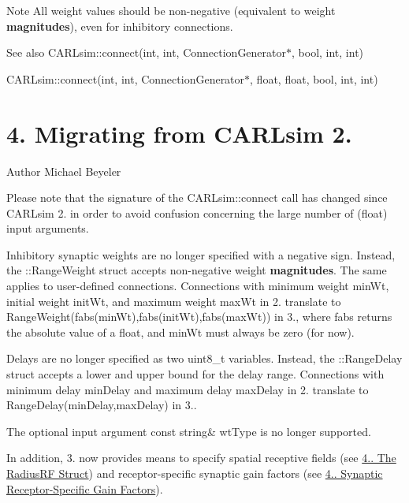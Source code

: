 \begin{DoxyNote}{Note}
All weight values should be non-\/negative (equivalent to weight {\bfseries magnitudes}), even for inhibitory connections. 
\end{DoxyNote}
\begin{DoxySeeAlso}{See also}
C\+A\+R\+Lsim\+::connect(int, int, Connection\+Generator$\ast$, bool, int, int) 

C\+A\+R\+Lsim\+::connect(int, int, Connection\+Generator$\ast$, float, float, bool, int, int)
\end{DoxySeeAlso}
\hypertarget{ch4_connections_ch4s4_migrating_connect}{}\section{4. Migrating from C\+A\+R\+Lsim 2.}\label{ch4_connections_ch4s4_migrating_connect}
\begin{DoxyAuthor}{Author}
Michael Beyeler
\end{DoxyAuthor}
Please note that the signature of the C\+A\+R\+Lsim\+::connect call has changed since C\+A\+R\+Lsim 2. in order to avoid confusion concerning the large number of (float) input arguments.
\begin{DoxyItemize}
\item Inhibitory synaptic weights are no longer specified with a negative sign. Instead, the \+::\+Range\+Weight struct accepts non-\/negative weight {\bfseries magnitudes}. The same applies to user-\/defined connections. Connections with minimum weight {\ttfamily min\+Wt}, initial weight {\ttfamily init\+Wt}, and maximum weight {\ttfamily max\+Wt} in 2. translate to {\ttfamily Range\+Weight(fabs(min\+Wt),fabs(init\+Wt),fabs(max\+Wt))} in 3., where {\ttfamily fabs} returns the absolute value of a {\ttfamily float}, and {\ttfamily min\+Wt} must always be zero (for now).
\item Delays are no longer specified as two {\ttfamily uint8\+\_\+t} variables. Instead, the \+::\+Range\+Delay struct accepts a lower and upper bound for the delay range. Connections with minimum delay {\ttfamily min\+Delay} and maximum delay {\ttfamily max\+Delay} in 2. translate to {\ttfamily Range\+Delay(min\+Delay,max\+Delay)} in 3..
\item The optional input argument {\ttfamily const string\& wt\+Type} is no longer supported.
\item In addition, 3. now provides means to specify spatial receptive fields (see \hyperlink{ch4_connections_ch4s1s3_radiusRF}{4.. The Radius\+RF Struct}) and receptor-\/specific synaptic gain factors (see \hyperlink{ch4_connections_ch4s1s4_receptor_gain}{4.. Synaptic Receptor-\/\+Specific Gain Factors}). 
\end{DoxyItemize}